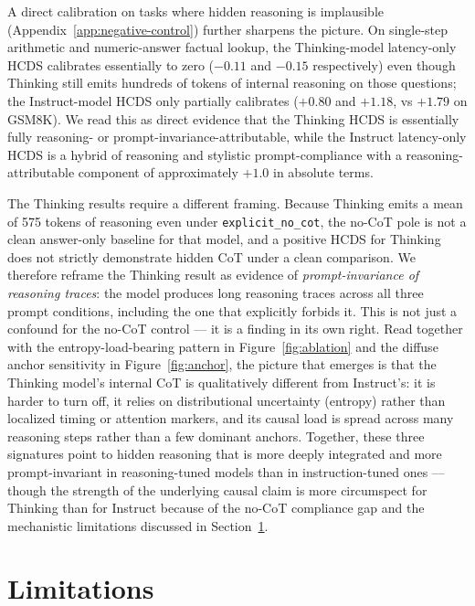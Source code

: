 \documentclass{article}
\theoremstyle{plain}
\theoremstyle{definition}
\theoremstyle{remark}
\begin{document}
A direct calibration on tasks where hidden reasoning is implausible (Appendix~\ref{app:negative-control}) further sharpens the picture. On single-step arithmetic and numeric-answer factual lookup, the Thinking-model latency-only HCDS calibrates essentially to zero ($-0.11$ and $-0.15$ respectively) even though Thinking still emits hundreds of tokens of internal reasoning on those questions; the Instruct-model HCDS only partially calibrates ($+0.80$ and $+1.18$, vs $+1.79$ on GSM8K). We read this as direct evidence that the Thinking HCDS is essentially fully reasoning- or prompt-invariance-attributable, while the Instruct latency-only HCDS is a hybrid of reasoning and stylistic prompt-compliance with a reasoning-attributable component of approximately $+1.0$ in absolute terms.

The Thinking results require a different framing. Because Thinking emits a mean of 575 tokens of reasoning even under \texttt{explicit\_no\_cot}, the no-CoT pole is not a clean answer-only baseline for that model, and a positive HCDS for Thinking does not strictly demonstrate hidden CoT under a clean comparison. We therefore reframe the Thinking result as evidence of \emph{prompt-invariance of reasoning traces}: the model produces long reasoning traces across all three prompt conditions, including the one that explicitly forbids it. This is not just a confound for the no-CoT control --- it is a finding in its own right. Read together with the entropy-load-bearing pattern in Figure~\ref{fig:ablation} and the diffuse anchor sensitivity in Figure~\ref{fig:anchor}, the picture that emerges is that the Thinking model's internal CoT is qualitatively different from Instruct's: it is harder to turn off, it relies on distributional uncertainty (entropy) rather than localized timing or attention markers, and its causal load is spread across many reasoning steps rather than a few dominant anchors. Together, these three signatures point to hidden reasoning that is more deeply integrated and more prompt-invariant in reasoning-tuned models than in instruction-tuned ones --- though the strength of the underlying causal claim is more circumspect for Thinking than for Instruct because of the no-CoT compliance gap and the mechanistic limitations discussed in Section~\ref{sec:limitations}.

\section{Limitations}
\label{sec:limitations}
\end{document}
